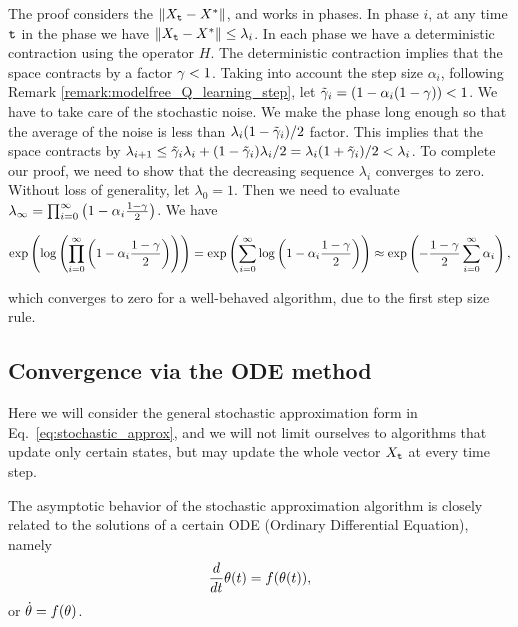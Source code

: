 The proof considers the $\|X_{\tt t}-X^*\|$, and  works in phases. In
phase $i$, at any time ${\tt t}$ in the phase we have
$\|X_{\tt t}-X^*\|\leq \lambda_i$.
%
In each phase we have a deterministic contraction using the operator
$H$. The deterministic contraction implies that
the space contracts by a factor $\gamma<1$. Taking into account the step size $\alpha_i$, following Remark \ref{remark:modelfree_Q_learning_step}, let $\tilde{\gamma}_i = \left( 1 - \alpha_i(1 - \gamma)\right)<1$. We have to take care
of the stochastic noise. We make the phase long enough so that the
average of the noise is less than $\lambda_i (1-\tilde{\gamma}_i)/2$ factor. This
implies that the space contracts by
$\lambda_{i+1}\leq\tilde{\gamma}_i\lambda_i+(1-\tilde{\gamma}_i)\lambda_i/2=\lambda_i(1+\tilde{\gamma}_i)/2<\lambda_i $. To complete our proof, we need to show that the decreasing sequence $\lambda_i$ converges to zero.
Without loss of generality, let $\lambda_0=1$. Then we need to evaluate $\lambda_\infty = \prod_{i=0}^{\infty}\left( 1 - \alpha_i\frac{1-\gamma}{2}\right)$. We have
\begin{small}
\begin{equation*}
    \exp\left( \log \left( \prod_{i=0}^{\infty}\left( 1 - \alpha_i\frac{1-\gamma}{2}\right) \right)\right) = \exp\left(   \sum_{i=0}^{\infty}\log\left( 1 - \alpha_i\frac{1-\gamma}{2}\right) \right)\approx \exp\left(   -\frac{1-\gamma}{2}\sum_{i=0}^{\infty}\alpha_i \right),
\end{equation*}
\end{small}
which converges to zero for a well-behaved algorithm, due to the first step size rule.

\subsection{Convergence via the ODE method}
Here we will consider the general stochastic approximation form in Eq.~\ref{eq:stochastic_approx}, and we will not limit ourselves to algorithms that update only certain states, but may update the whole vector $X_{\tt t}$ at every time step. 

The asymptotic behavior of the stochastic approximation algorithm is closely related to the solutions
of a certain ODE (Ordinary Differential Equation), namely
$$
\frac{d}{dt}\theta(t)=f(\theta(t)),
$$
or $\dot{\theta}=f(\theta)$.


